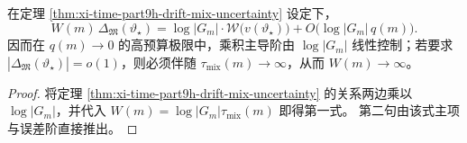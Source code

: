 \begin{corollary}[谱税--漂移乘积律]\label{cor:xi-time-part9h-spectral-tax-drift-product}
在定理 \ref{thm:xi-time-part9h-drift-mix-uncertainty} 设定下，
\[
W(m)\,\Delta_{\mathfrak M}(\vartheta_\star)
=
\log|G_m|\cdot \mathcal W\!\bigl(v(\vartheta_\star)\bigr)
+O\!\bigl(\log|G_m|\,q(m)\bigr).
\]
因而在 \(q(m)\to0\) 的高预算极限中，乘积主导阶由 \(\log|G_m|\) 线性控制；若要求 \(|\Delta_{\mathfrak M}(\vartheta_\star)|=o(1)\)，则必须伴随 \(\tau_{\mathrm{mix}}(m)\to\infty\)，从而 \(W(m)\to\infty\)。
\end{corollary}
\begin{proof}
将定理 \ref{thm:xi-time-part9h-drift-mix-uncertainty} 的关系两边乘以 \(\log|G_m|\)，并代入
\(
W(m)=\log|G_m|\tau_{\mathrm{mix}}(m)
\)
即得第一式。
第二句由该式主项与误差阶直接推出。
\end{proof}
